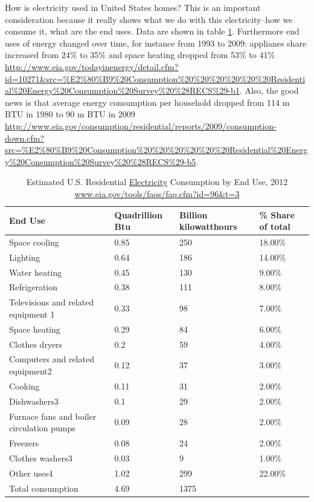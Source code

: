 \documentclass[10pt, letterpaper]{article}
\begin{document}
\begin{spacing}{1.4}
How is electricity used in United States homes? This is an important
consideration because it really shows what we do with this electricity--how we
consume it, what are the end uses. Data are shown in table
\ref{eleEndUse}. Furthermore end uses of energy changed over time, for instance
 from 1993 to 2009: applianes share increased from 24\% to 35\% and space
 heating dropped from 53\% to 41\%
 \url{http://www.eia.gov/todayinenergy/detail.cfm?id=10271&src=%E2%80%B9%20Consumption%20%20%20%20%20%20Residential%20Energy%20Consumption%20Survey%20%28RECS%29-b1}. 
Also, the good news is that average energy consumption per household dropped from 114 m BTU in 1980 to
90 m BTU in 2009 \url{http://www.eia.gov/consumption/residential/reports/2009/consumption-down.cfm?src=%E2%80%B9%20Consumption%20%20%20%20%20%20Residential%20Energy%20Consumption%20Survey%20%28RECS%29-b5}.  


\begin{table}[H]\centering\footnotesize
\caption{\label{eleEndUse}  Estimated U.S. Residential \underline{Electricity} Consumption by End
  Use, 2012 \url{www.eia.gov/tools/faqs/faq.cfm?id=96&t=3}}
\begin{tabular} {llll}   \hline 
End Use&Quadrillion Btu &Billion kilowatthours& \% Share of total\\\hline 
Space cooling&0.85&250&18.00\%\\
Lighting&0.64&186&14.00\%\\
Water heating&0.45&130&9.00\%\\
Refrigeration&0.38&111&8.00\%\\
Televisions and related equipment 1&0.33&98&7.00\%\\
Space heating&0.29&84&6.00\%\\
Clothes dryers&0.2&59&4.00\%\\
Computers and related equipment2&0.12&37&3.00\%\\
Cooking&0.11&31&2.00\%\\
Dishwashers3 &0.1&29&2.00\%\\
Furnace fans and boiler circulation pumps&0.09&28&2.00\%\\
Freezers&0.08&24&2.00\%\\
Clothes washers3&0.03&9&1.00\%\\
Other uses4&1.02&299&22.00\%\\
Total consumption&4.69&1375&\\\hline
\end{tabular}\end{table}


\end{spacing}
\end{document}
